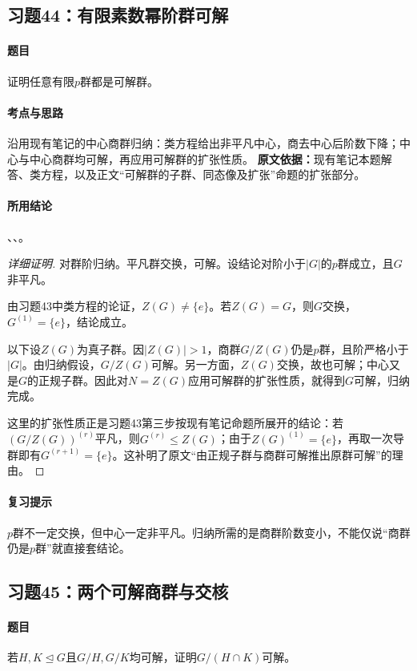 \subsection{习题44：有限素数幂阶群可解}
\paragraph{题目}证明任意有限$p$群都是可解群。
\paragraph{考点与思路}沿用现有笔记的中心商群归纳：类方程给出非平凡中心，商去中心后阶数下降；中心与中心商群均可解，再应用可解群的扩张性质。
\textbf{原文依据：}现有笔记本题解答、类方程，以及正文“可解群的子群、同态像及扩张”命题的扩张部分。
\paragraph{所用结论}、、。
\begin{proof}[详细证明]
对群阶归纳。平凡群交换，可解。设结论对阶小于$|G|$的$p$群成立，且$G$非平凡。

由习题43中类方程的论证，$Z(G)\ne\{e\}$。若$Z(G)=G$，则$G$交换，$G^{(1)}=\{e\}$，结论成立。

以下设$Z(G)$为真子群。因$|Z(G)|>1$，商群$G/Z(G)$仍是$p$群，且阶严格小于$|G|$。由归纳假设，$G/Z(G)$可解。另一方面，$Z(G)$交换，故也可解；中心又是$G$的正规子群。因此对$N=Z(G)$应用可解群的扩张性质，就得到$G$可解，归纳完成。

这里的扩张性质正是习题43第三步按现有笔记命题所展开的结论：若$(G/Z(G))^{(r)}$平凡，则$G^{(r)}\le Z(G)$；由于$Z(G)^{(1)}=\{e\}$，再取一次导群即有$G^{(r+1)}=\{e\}$。这补明了原文“由正规子群与商群可解推出原群可解”的理由。
\end{proof}
\paragraph{复习提示}$p$群不一定交换，但中心一定非平凡。归纳所需的是商群阶数变小，不能仅说“商群仍是$p$群”就直接套结论。

\subsection{习题45：两个可解商群与交核}
\paragraph{题目}若$H,K\trianglelefteq G$且$G/H,G/K$均可解，证明$G/(H\cap K)$可解。
